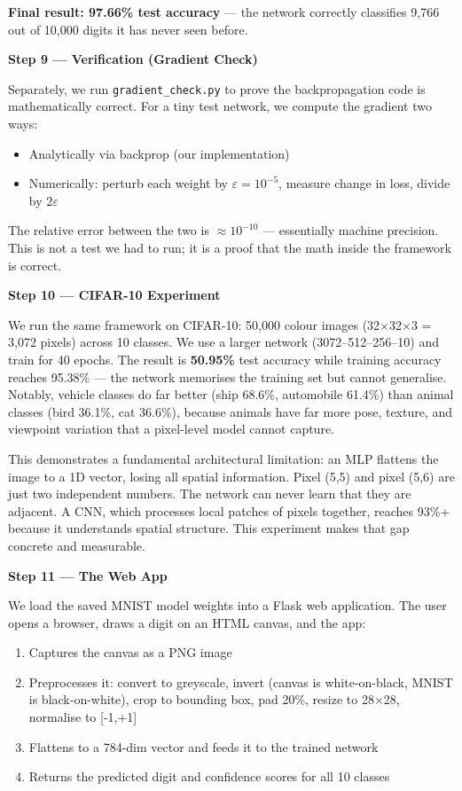 \documentclass[12pt, a4paper]{article}
\begin{document}
\textbf{Final result: 97.66\% test accuracy} --- the network correctly classifies 9,766 out of 10,000 digits it has never seen before.

\textbf{Step 9 --- Verification (Gradient Check)}

Separately, we run \texttt{gradient\_check.py} to prove the backpropagation code is mathematically correct. For a tiny test network, we compute the gradient two ways:
\begin{itemize}
  \item Analytically via backprop (our implementation)
  \item Numerically: perturb each weight by $\varepsilon = 10^{-5}$, measure change in loss, divide by $2\varepsilon$
\end{itemize}
The relative error between the two is $\approx 10^{-10}$ --- essentially machine precision. This is not a test we had to run; it is a proof that the math inside the framework is correct.

\textbf{Step 10 --- CIFAR-10 Experiment}

We run the same framework on CIFAR-10: 50,000 colour images (32$\times$32$\times$3 = 3,072 pixels) across 10 classes. We use a larger network (3072--512--256--10) and train for 40 epochs. The result is \textbf{50.95\%} test accuracy while training accuracy reaches 95.38\% --- the network memorises the training set but cannot generalise. Notably, vehicle classes do far better (ship 68.6\%, automobile 61.4\%) than animal classes (bird 36.1\%, cat 36.6\%), because animals have far more pose, texture, and viewpoint variation that a pixel-level model cannot capture.

This demonstrates a fundamental architectural limitation: an MLP flattens the image to a 1D vector, losing all spatial information. Pixel (5,5) and pixel (5,6) are just two independent numbers. The network can never learn that they are adjacent. A CNN, which processes local patches of pixels together, reaches 93\%+ because it understands spatial structure. This experiment makes that gap concrete and measurable.

\textbf{Step 11 --- The Web App}

We load the saved MNIST model weights into a Flask web application. The user opens a browser, draws a digit on an HTML canvas, and the app:
\begin{enumerate}
  \item Captures the canvas as a PNG image
  \item Preprocesses it: convert to greyscale, invert (canvas is white-on-black, MNIST is black-on-white), crop to bounding box, pad 20\%, resize to 28$\times$28, normalise to [-1,+1]
  \item Flattens to a 784-dim vector and feeds it to the trained network
  \item Returns the predicted digit and confidence scores for all 10 classes
\end{enumerate}
\end{document}
